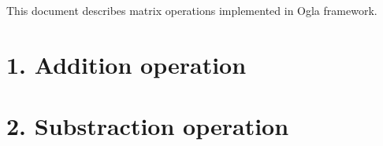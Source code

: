 \documentclass[a4paper,fleqn,12pt]{book}
\author{Marcin Matuła}
\begin{document}
This document describes matrix operations implemented in Ogla framework.

\section{1. Addition operation}

\section{2. Substraction operation}
\end{document}

